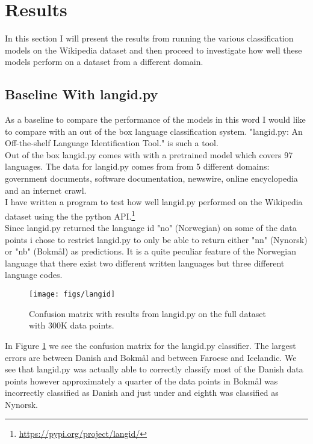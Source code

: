 \section{Results}
In this section I will present the results from running the various classification models on the Wikipedia dataset and then proceed to investigate how well these models perform on a dataset from a different domain.

\subsection{Baseline With langid.py}

As a baseline to compare the performance of the models in this word I would like to compare with an out of the box language classification system. "langid.py: An Off-the-shelf Language Identification Tool." \cite{langID} is such a tool.\\

Out of the box langid.py comes with with a pretrained model which covers 97 languages. The data for langid.py comes from from 5 different domains: government documents, software documentation, newswire, online encyclopedia and an internet crawl.\\

I have written a program to test how well langid.py performed on the Wikipedia dataset using the the python API.\footnote{\url{https://pypi.org/project/langid/}}\\

Since langid.py returned the language id "no" (Norwegian) on some of the data points i chose to restrict langid.py to only be able to return either "nn" (Nynorsk) or "nb" (Bokmål) as predictions. It is a quite peculiar feature of the Norwegian language that there exist two different written languages but three different language codes.

\begin{figure}[h!]
  \centering
  \texttt{[image: figs/langid]}
  \caption{Confusion matrix with results from langid.py on the full dataset with 300K data points. }
  \label{langid_confusion_matrix}
\end{figure}

In Figure \ref{langid_confusion_matrix} we see the confusion matrix for the langid.py classifier. The largest errors are between Danish and Bokmål and between Faroese and Icelandic. We see that langid.py was actually able to correctly classify most of the Danish data points however approximately a quarter of the data points in Bokmål was incorrectly classified as Danish and just under and eighth was classified as Nynorsk.\\

